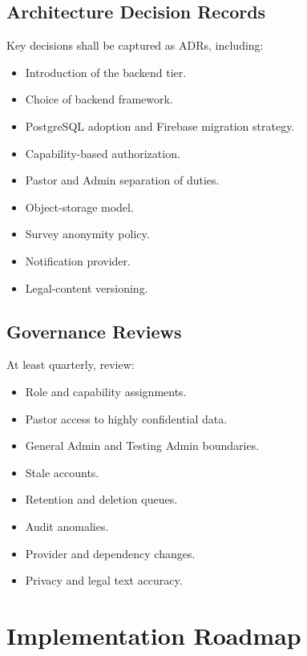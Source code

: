 \documentclass[11pt,a4paper,oneside]{report}
\begin{document}
\section{Architecture Decision Records}

Key decisions shall be captured as ADRs, including:

\begin{itemize}
  \item Introduction of the backend tier.
  \item Choice of backend framework.
  \item PostgreSQL adoption and Firebase migration strategy.
  \item Capability-based authorization.
  \item Pastor and Admin separation of duties.
  \item Object-storage model.
  \item Survey anonymity policy.
  \item Notification provider.
  \item Legal-content versioning.
\end{itemize}

\section{Governance Reviews}

At least quarterly, review:

\begin{itemize}
  \item Role and capability assignments.
  \item Pastor access to highly confidential data.
  \item General Admin and Testing Admin boundaries.
  \item Stale accounts.
  \item Retention and deletion queues.
  \item Audit anomalies.
  \item Provider and dependency changes.
  \item Privacy and legal text accuracy.
\end{itemize}

\chapter{Implementation Roadmap}
\end{document}

